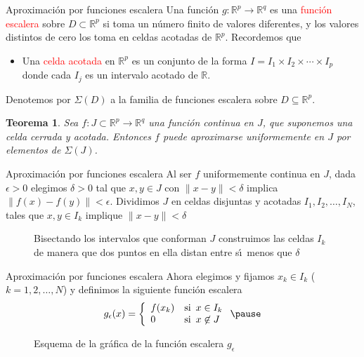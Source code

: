 \documentclass[xcolor=dvipsnames,10pt,handout, draft]{beamer}
\newcommand{\incfig}[1]{%
    \def\svgwidth{3.5in}
    {#1.pdf_tex}
}
\newcommand{\rz}{\mathbb R}
\newcommand{\rzp}{\mathbb R^{p}}
\newcommand{\rzq}{\mathbb R^{q}}
\newtheorem*{teo}{Teorema}
\begin{document}
\begin{frame}{Aproximaci\'on por funciones escalera}
Una funci\'on $g:\rzp\to\rzq$ es una \textcolor{red}{funci\'on escalera} sobre $D\subset\rzp$ si toma un n\'umero finito de valores diferentes, y los valores distintos de cero los toma en celdas acotadas de $\rzp$.
\vskip6pt\pause
Recordemos que 
\begin{itemize}
\item Una \textcolor{red}{celda acotada} en $\rzp$ es un conjunto de la forma $I=I_1\times I_2\times\cdots\times I_p$ donde cada $I_j$ es un intervalo acotado de $\rz$.\pause
\end{itemize} 
Denotemos por $\Sigma(D)$ a la familia de funciones escalera sobre $D\subseteq\rzp$. \pause
\begin{teo}
Sea $f:J\subset\rzp\to\rzq$ una funci\'on continua en $J$, que suponemos una celda cerrada y acotada. Entonces $f$ puede aproximarse uniformemente en $J$ por elementos de $\Sigma(J)$. 
\end{teo}
\end{frame}


\begin{frame}{Aproximaci\'on por funciones escalera}
Al ser $f$ uniformemente continua en $J$, dada $\epsilon>0$ elegimos $\delta>0$ tal que $x,y\in J$ con $\|x-y\|<\delta$ implica $\|f(x)-f(y)\|<\epsilon$.
\pause\vskip4pt
Dividimos $J$ en celdas disjuntas y acotadas $I_1,I_2,\dots,I_N$, tales que $x,y\in I_k$ implique $\|x-y\|<\delta$
\begin{figure}[ht]
    \centering
\caption{Bisectando los intervalos que conforman $J$ construimos las celdas $I_k$ de manera que dos puntos en ella distan entre s\'\i\ menos que $\delta$}
\end{figure}
\end{frame}


\begin{frame}{Aproximaci\'on por funciones escalera}
Ahora elegimos y fijamos $x_k\in I_k$ ($k=1,2,\dots,N$) y definimos la siguiente funci\'on escalera
$$g_\epsilon(x)=\left\{\begin{array}{ll}
					f(x_k)&\text{si }\,x\in I_k\\
					0&\text{si }\,x\not\in J
				\end{array}\right.\pause$$
\begin{figure}[ht]
    \centering
\caption{Esquema de la gr\'afica de la funci\'on escalera $g_\epsilon$}
\end{figure}
\end{frame}
\end{document}
